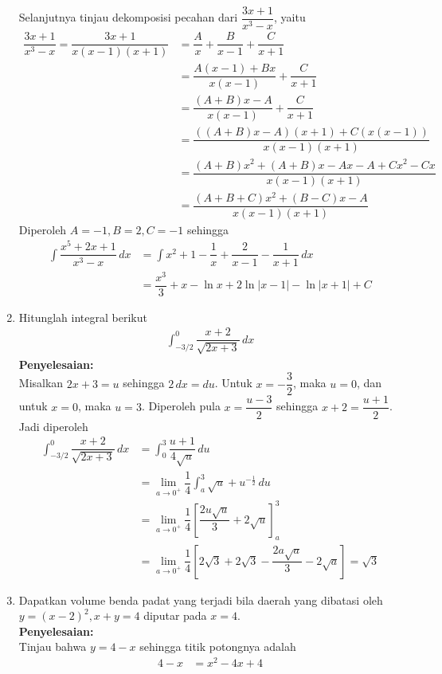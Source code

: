 \documentclass{article}
\begin{document}
\begin{enumerate}
	Selanjutnya tinjau dekomposisi pecahan dari $\dfrac{3x+1}{x^3-x}$, yaitu 
	\begin{align*}
	\dfrac{3x+1}{x^3-x} = \dfrac{3x+1}{x(x-1)(x+1)} &= \dfrac{A}{x} + \dfrac{B}{x-1} + \dfrac{C}{x+1}\\
	&= \dfrac{A(x-1)+Bx}{x(x-1)} +\dfrac{C}{x+1}\\
	&= \dfrac{(A+B)x-A}{x(x-1)} +\dfrac{C}{x+1}\\
	&= \dfrac{((A+B)x-A)(x+1)+C(x(x-1))}{x(x-1)(x+1)}\\
	&= \dfrac{(A+B)x^2+(A+B)x-Ax-A+Cx^2-Cx}{x(x-1)(x+1)}\\
	&= \dfrac{(A+B+C)x^2+(B-C)x-A}{x(x-1)(x+1)}
	\end{align*}
	Diperoleh $A=-1, B=2, C=-1$ sehingga 
	\begin{align*}
	\int \dfrac{x^5+2x+1}{x^3-x}\, dx &= \int x^2+1 -\dfrac{1}{x}+\dfrac{2}{x-1}-\dfrac{1}{x+1} \, dx\\
	&= \dfrac{x^3}{3} + x -\ln x +2\ln |x-1| -\ln |x+1| +C 
	\end{align*}
	\item Hitunglah integral berikut 
	\begin{align*}
	\int_{-3/2}^0 \dfrac{x+2}{\sqrt{2x+3}}\, dx
	\end{align*}
	\textbf{Penyelesaian:}\\
	Misalkan $2x+3=u$ sehingga $2\, dx=du$. Untuk $x=-\dfrac{3}{2}$, maka $u=0$, dan untuk $x=0$, maka $u=3$. Diperoleh pula $x=\dfrac{u-3}{2}$ sehingga $x+2=\dfrac{u+1}{2}$. Jadi diperoleh 
	\begin{align*}
	\int_{-3/2}^0 \dfrac{x+2}{\sqrt{2x+3}}\, dx &= \int_0^3 \dfrac{u+1}{4\sqrt{u}} \, du\\
	&= \lim_{a\rightarrow 0^+} \dfrac{1}{4}\int_a^3 \sqrt{u} + u^{-\frac{1}{2}} \, du\\
	&= \lim_{a\rightarrow 0^+} \dfrac{1}{4}\left[\dfrac{2u\sqrt{u}}{3}+2\sqrt{u}\right]^3_a\\
	&= \lim_{a\rightarrow 0^+} \dfrac{1}{4}\left[2\sqrt{3}+2\sqrt{3} - \dfrac{2a\sqrt{a}}{3}-2\sqrt{a}\right] = \sqrt{3}
	\end{align*}
	\item Dapatkan volume benda padat yang terjadi bila daerah yang dibatasi oleh $y=(x-2)^2,x+y=4$ diputar pada $x=4$.\\
	\textbf{Penyelesaian:}\\
	Tinjau bahwa $y=4-x$ sehingga titik potongnya adalah 
	\begin{align*}
	4-x &= x^2-4x+4\\

\end{align*}
\end{enumerate}
\end{document}

